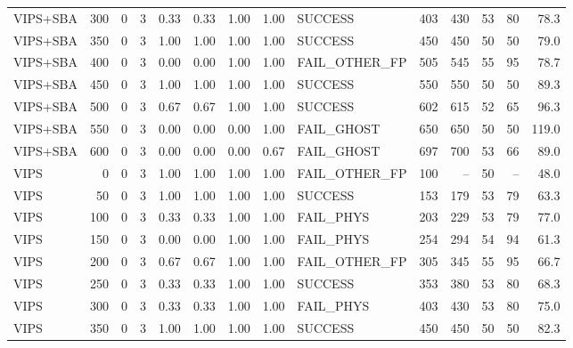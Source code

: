 \begin{tabular}{lrrr|rrrr|lrr|rr|r}
  VIPS+SBA                       &  300 &    0 &   3 & 0.33 & 0.33 & 1.00 & 1.00 & SUCCESS         &   403 &   430 &    53 &    80 &  78.3 \\
  VIPS+SBA                       &  350 &    0 &   3 & 1.00 & 1.00 & 1.00 & 1.00 & SUCCESS         &   450 &   450 &    50 &    50 &  79.0 \\
  VIPS+SBA                       &  400 &    0 &   3 & 0.00 & 0.00 & 1.00 & 1.00 & FAIL_OTHER_FP   &   505 &   545 &    55 &    95 &  78.7 \\
  VIPS+SBA                       &  450 &    0 &   3 & 1.00 & 1.00 & 1.00 & 1.00 & SUCCESS         &   550 &   550 &    50 &    50 &  89.3 \\
  VIPS+SBA                       &  500 &    0 &   3 & 0.67 & 0.67 & 1.00 & 1.00 & SUCCESS         &   602 &   615 &    52 &    65 &  96.3 \\
  VIPS+SBA                       &  550 &    0 &   3 & 0.00 & 0.00 & 0.00 & 1.00 & FAIL_GHOST      &   650 &   650 &    50 &    50 & 119.0 \\
  VIPS+SBA                       &  600 &    0 &   3 & 0.00 & 0.00 & 0.00 & 0.67 & FAIL_GHOST      &   697 &   700 &    53 &    66 &  89.0 \\
  VIPS                           &    0 &    0 &   3 & 1.00 & 1.00 & 1.00 & 1.00 & FAIL_OTHER_FP   &   100 &    -- &    50 &    -- &  48.0 \\
  VIPS                           &   50 &    0 &   3 & 1.00 & 1.00 & 1.00 & 1.00 & SUCCESS         &   153 &   179 &    53 &    79 &  63.3 \\
  VIPS                           &  100 &    0 &   3 & 0.33 & 0.33 & 1.00 & 1.00 & FAIL_PHYS       &   203 &   229 &    53 &    79 &  77.0 \\
  VIPS                           &  150 &    0 &   3 & 0.00 & 0.00 & 1.00 & 1.00 & FAIL_PHYS       &   254 &   294 &    54 &    94 &  61.3 \\
  VIPS                           &  200 &    0 &   3 & 0.67 & 0.67 & 1.00 & 1.00 & FAIL_OTHER_FP   &   305 &   345 &    55 &    95 &  66.7 \\
  VIPS                           &  250 &    0 &   3 & 0.33 & 0.33 & 1.00 & 1.00 & SUCCESS         &   353 &   380 &    53 &    80 &  68.3 \\
  VIPS                           &  300 &    0 &   3 & 0.33 & 0.33 & 1.00 & 1.00 & FAIL_PHYS       &   403 &   430 &    53 &    80 &  75.0 \\
  VIPS                           &  350 &    0 &   3 & 1.00 & 1.00 & 1.00 & 1.00 & SUCCESS         &   450 &   450 &    50 &    50 &  82.3 \\

\end{tabular}

